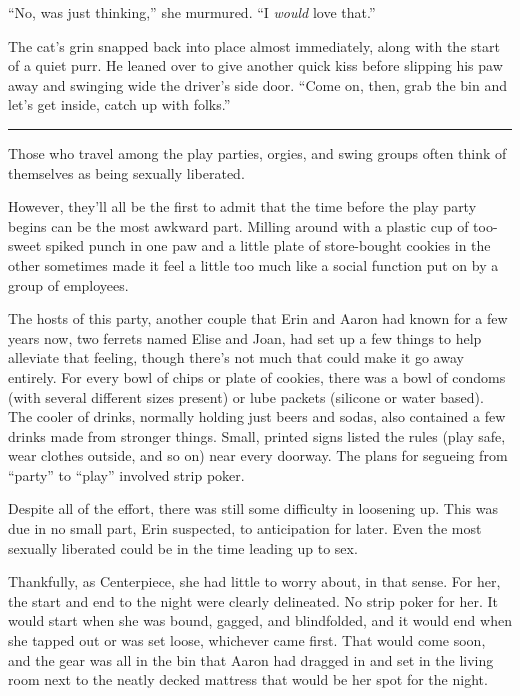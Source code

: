``No, was just thinking,'' she murmured. ``I \emph{would} love that.''

The cat's grin snapped back into place almost immediately, along with the start of a quiet purr. He leaned over to give another quick kiss before slipping his paw away and swinging wide the driver's side door. ``Come on, then, grab the bin and let's get inside, catch up with folks.''

\begin{center}\rule{0.5\linewidth}{\linethickness}\end{center}

Those who travel among the play parties, orgies, and swing groups often think of themselves as being sexually liberated.

However, they'll all be the first to admit that the time before the play party begins can be the most awkward part. Milling around with a plastic cup of too-sweet spiked punch in one paw and a little plate of store-bought cookies in the other sometimes made it feel a little too much like a social function put on by a group of employees.

The hosts of this party, another couple that Erin and Aaron had known for a few years now, two ferrets named Elise and Joan, had set up a few things to help alleviate that feeling, though there's not much that could make it go away entirely. For every bowl of chips or plate of cookies, there was a bowl of condoms (with several different sizes present) or lube packets (silicone or water based). The cooler of drinks, normally holding just beers and sodas, also contained a few drinks made from stronger things. Small, printed signs listed the rules (play safe, wear clothes outside, and so on) near every doorway. The plans for segueing from ``party'' to ``play'' involved strip poker.

Despite all of the effort, there was still some difficulty in loosening up. This was due in no small part, Erin suspected, to anticipation for later. Even the most sexually liberated could be in the time leading up to sex.

Thankfully, as Centerpiece, she had little to worry about, in that sense. For her, the start and end to the night were clearly delineated. No strip poker for her. It would start when she was bound, gagged, and blindfolded, and it would end when she tapped out or was set loose, whichever came first. That would come soon, and the gear was all in the bin that Aaron had dragged in and set in the living room next to the neatly decked mattress that would be her spot for the night.

